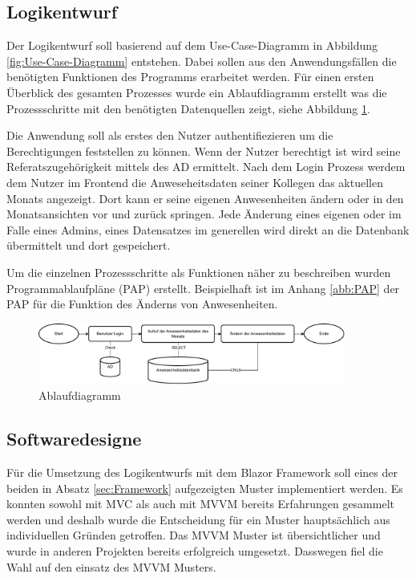 
\subsection{Logikentwurf}
\label{sec:Logikentwurf}
Der Logikentwurf soll basierend auf dem Use-Case-Diagramm in Abbildung \ref{fig:Use-Case-Diagramm} entstehen. Dabei sollen aus den Anwendungsfällen die benötigten Funktionen des Programms erarbeitet werden. Für einen ersten Überblick des gesamten Prozesses wurde ein Ablaufdiagramm erstellt was die Prozessschritte mit den benötigten Datenquellen zeigt, siehe Abbildung \ref{abb:Flow}.

Die Anwendung soll als erstes den Nutzer authentifiezieren um die Berechtigungen feststellen zu können. Wenn der Nutzer berechtigt ist wird seine Referatszugehörigkeit mittels des AD ermittelt. Nach dem Login Prozess werdem dem Nutzer im Frontend die Anweseheitsdaten seiner Kollegen das aktuellen Monats angezeigt. Dort kann er seine eigenen Anwesenheiten ändern oder in den Monatsansichten vor und zurück springen. Jede Änderung eines eigenen oder im Falle eines Admins, eines Datensatzes im generellen wird direkt an die Datenbank übermittelt und dort gespeichert.

Um die einzelnen Prozessschritte als Funktionen näher zu beschreiben wurden Programmablaufpläne (PAP) erstellt. Beispielhaft ist im Anhang \ref{abb:PAP} der PAP für die Funktion des Änderns von Anwesenheiten.

\begin{figure}[htb]
    \centering
    \includegraphics[width=0.9\textwidth,angle=0]{abb/Flow-Diagramm.drawio.pdf}
    \caption[Beschreibung]{Ablaufdiagramm}
    \label{abb:Flow}
\end{figure}

\subsection{Softwaredesigne}
\label{sec:Softwaredesigne}
Für die Umsetzung des Logikentwurfs mit dem Blazor Framework soll eines der beiden in Absatz \ref{sec:Framework}  aufgezeigten Muster implementiert werden. Es konnten sowohl mit MVC als auch mit MVVM bereits Erfahrungen gesammelt werden und deshalb wurde die Entscheidung für ein Muster hauptsächlich aus individuellen Gründen getroffen. Das MVVM Muster ist übersichtlicher und wurde in anderen Projekten bereits erfolgreich umgesetzt. Dasswegen fiel die Wahl auf den einsatz des MVVM Musters.

